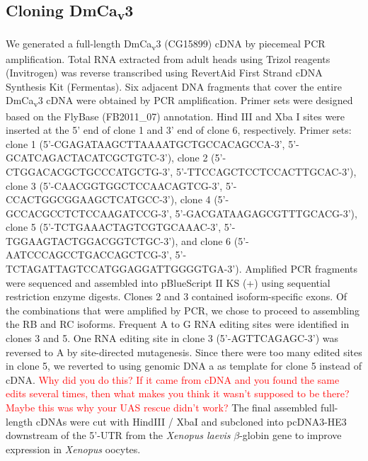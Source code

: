 \subsection*{Cloning DmCa\textsubscript{v}3}

We generated a full-length DmCa\textsubscript{v}3 (CG15899) cDNA by piecemeal PCR amplification.
Total RNA extracted from adult heads using Trizol reagents (Invitrogen) was reverse transcribed using RevertAid First Strand cDNA Synthesis Kit (Fermentas).
Six adjacent DNA fragments that cover the entire DmCa\textsubscript{v}3 cDNA were obtained by PCR amplification. 
Primer sets were designed based on the FlyBase (FB2011_07) annotation. 
Hind III and Xba I sites were inserted at the 5' end of clone 1 and 3' end of clone 6, respectively.
Primer sets: clone 1 (5'-CGAGATAAGCTTAAAATGCTGCCACAGCCA-3', 5'-GCATCAGACTACATCGCTGTC-3'), clone 2 (5'-CTGGACACGCTGCCCATGCTG-3', 5'-TTCCAGCTCCTCCACTTGCAC-3'), clone 3 (5'-CAACGGTGGCTCCAACAGTCG-3', 5'-CCACTGGCGGAAGCTCATGCC-3'), clone 4 (5'-GCCACGCCTCTCCAAGATCCG-3', 5'-GACGATAAGAGCGTTTGCACG-3'), clone 5 (5'-TCTGAAACTAGTCGTGCAAAC-3', 5'-TGGAAGTACTGGACGGTCTGC-3'), and clone 6 (5'-AATCCCAGCCTGACCAGCTCG-3', 5'-TCTAGATTAGTCCATGGAGGATTGGGGTGA-3').
Amplified PCR fragments were sequenced and assembled into pBlueScript II KS (+) using sequential restriction enzyme digests.
Clones 2 and 3 contained isoform-specific exons.
Of the combinations that were amplified by PCR, we chose to proceed to assembling the RB and RC isoforms.
Frequent A to G RNA editing sites were identified in clones 3 and 5.
One RNA editing site in clone 3 (5'-AGTTCAGAGC-3') was reversed to A by site-directed mutagenesis.
Since there were too many edited sites in clone 5, we reverted to using genomic DNA a as template for clone 5 instead of cDNA.
\textcolor{red}{Why did you do this? If it came from cDNA and you found the same edits several times, then what makes you think it wasn't supposed to be there? Maybe this was why your UAS rescue didn't work?}
The final assembled full-length cDNAs were cut with HindIII / XbaI and subcloned into pcDNA3-HE3 downstream of the 5'-UTR from the \emph{Xenopus laevis} $\beta$-globin gene to improve expression in \emph{Xenopus} oocytes.

  